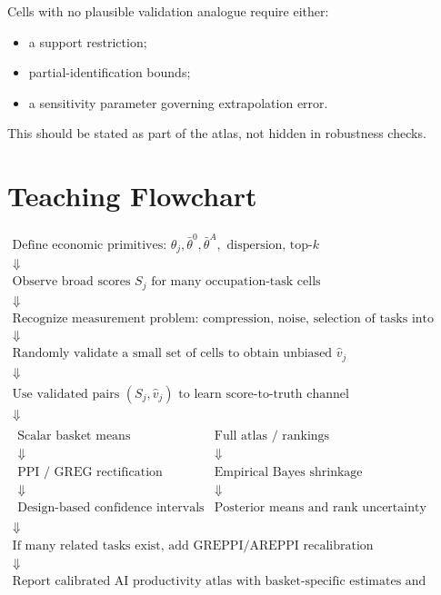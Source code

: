 \documentclass[11pt]{article}
\begin{document}
Cells with no plausible validation analogue require either:
\begin{itemize}[leftmargin=*]
  \item a support restriction;
  \item partial-identification bounds;
  \item a sensitivity parameter governing extrapolation error.
\end{itemize}
This should be stated as part of the atlas, not hidden in robustness checks.

\section{Teaching Flowchart}

\[
\begin{array}{c}
\text{Define economic primitives: }\theta_j,\bar\theta^0,\bar\theta^A,\text{ dispersion, top-}k \\
\Downarrow \\
\text{Observe broad scores }S_j\text{ for many occupation-task cells} \\
\Downarrow \\
\text{Recognize measurement problem: compression, noise, selection of tasks into usage} \\
\Downarrow \\
\text{Randomly validate a small set of cells to obtain unbiased }\widehat v_j \\
\Downarrow \\
\text{Use validated pairs }(S_j,\widehat v_j)\text{ to learn score-to-truth channel} \\
\Downarrow \\
\begin{array}{cc}
\text{Scalar basket means} & \text{Full atlas / rankings} \\
\Downarrow & \Downarrow \\
\text{PPI / GREG rectification} & \text{Empirical Bayes shrinkage} \\
\Downarrow & \Downarrow \\
\text{Design-based confidence intervals} & \text{Posterior means and rank uncertainty}
\end{array} \\
\Downarrow \\
\text{If many related tasks exist, add GREPPI/AREPPI recalibration} \\
\Downarrow \\
\text{Report calibrated AI productivity atlas with basket-specific estimates and uncertainty}
\end{array}
\]
\end{document}
